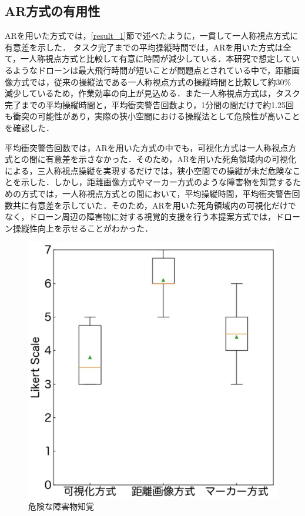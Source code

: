 \documentclass[submit,techrep]{ipsj}
\begin{document}
\subsection{AR方式の有用性}
ARを用いた方式では，\ref{result_1}節で述べたように，一貫して一人称視点方式に有意差を示した．
タスク完了までの平均操縦時間では，ARを用いた方式は全て，一人称視点方式と比較して有意に時間が減少している．本研究で想定しているようなドローンは最大飛行時間が短いことが問題点とされている中で，距離画像方式では，従来の操縦法である一人称視点方式の操縦時間と比較して約30\% 減少しているため，作業効率の向上が見込める．また一人称視点方式は，タスク完了までの平均操縦時間と，平均衝突警告回数より，1分間の間だけで約1.25回も衝突の可能性があり，実際の狭小空間における操縦法として危険性が高いことを確認した．
\par
平均衝突警告回数では，ARを用いた方式の中でも，可視化方式は一人称視点方式との間に有意差を示さなかった．そのため，ARを用いた死角領域内の可視化による，三人称視点操縦を実現するだけでは，狭小空間での操縦が未だ危険なことを示した．しかし，距離画像方式やマーカー方式のような障害物を知覚するための方式では，一人称視点方式との間において，平均操縦時間，平均衝突警告回数共に有意差を示していた．そのため，ARを用いた死角領域内の可視化だけでなく，ドローン周辺の障害物に対する視覚的支援を行う本提案方式では，ドローン操縦性向上を示せることがわかった．



\begin{figure}[tb]
\centering
\includegraphics[width=\linewidth]{img/04_likert2.eps}
\caption{危険な障害物知覚}
\label{fig:04_likert2}
\end{figure}
\end{document}
